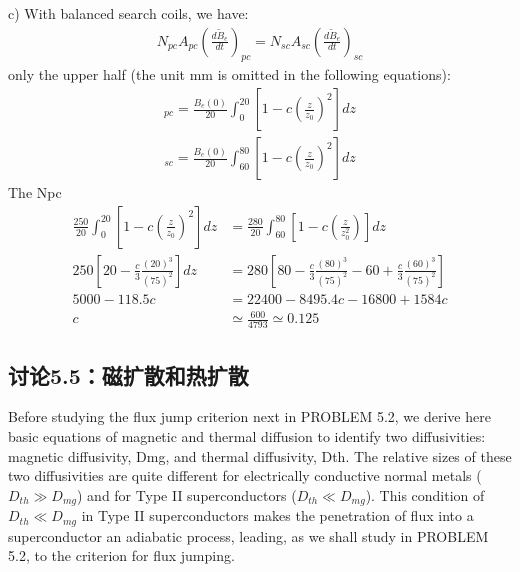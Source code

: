 c) With balanced search coils, we have:
\begin{align*}%
N_{pc}A_{pc}(\frac{d\tilde{B}_{e}}{dt})_{pc}=N_{sc}A_{sc}(\frac{d\tilde{B}_{e}}{dt})_{sc}\tag{S1.2}
\end{align*}
only the upper half (the unit mm is omitted in the following equations):
\begin{align*}%
[\tilde{B}_{e}]_{pc}=\frac{B_{e}(0)}{20}\int_{0}^{20}[1-c(\frac{z}{z_{0}})^{2}]dz\tag{S1.3a}
\end{align*}
\begin{align*}%
[\tilde{B}_{e}]_{sc}=\frac{B_{e}(0)}{20}\int_{60}^{80}[1-c(\frac{z}{z_{0}})^{2}]dz\tag{S1.3b}
\end{align*}
The Npc%
\begin{align*}%
\frac{250}{20}\int_{0}^{20}[1-c(\frac{z}{z_{0}})^{2}]dz&=\frac{280}{20}\int_{60}^{80}[1-c(\frac{z}{z_{0}^{2}})]dz\\\tag{S1.4}
250[20-\frac{c}{3}\frac{(20)^{3}}{(75)^{2}}]dz&=280[80-\frac{c}{3}\frac{(80)^{3}}{(75)^{2}}-60+\frac{c}{3}\frac{(60)^{3}}{(75)^{2}}]\\
5000-118.5c&=22400-8495.4c-16800+1584c\\
c&\simeq\frac{600}{4793}\simeq 0.125
\end{align*}


\subsection{讨论5.5：磁扩散和热扩散}
Before studying the flux jump criterion next in PROBLEM 5.2, we derive here basic
equations of magnetic and thermal diffusion to identify two diffusivities: magnetic
diffusivity, Dmg, and thermal diffusivity, Dth. The relative sizes of these two
diffusivities are quite different for electrically conductive normal metals ($D_{th}\gg D_{mg}$) and for Type II superconductors ($D_{th}\ll D_{mg}$). This condition of $D_{th}\ll D_{mg}$
in Type II superconductors makes the penetration of flux into a superconductor
an adiabatic process, leading, as we shall study in PROBLEM 5.2, to the criterion
for flux jumping.

